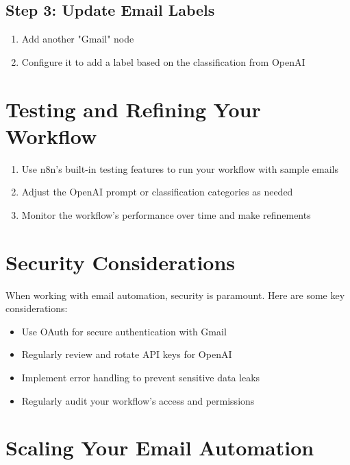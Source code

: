 
\subsection{Step 3: Update Email Labels}

\begin{enumerate}
    \item Add another "Gmail" node
    \item Configure it to add a label based on the classification from OpenAI
\end{enumerate}



\section{Testing and Refining Your Workflow}

\begin{enumerate}
    \item Use n8n's built-in testing features to run your workflow with sample emails
    \item Adjust the OpenAI prompt or classification categories as needed
    \item Monitor the workflow's performance over time and make refinements
\end{enumerate}


\section{Security Considerations}

When working with email automation, security is paramount. Here are some key considerations:

\begin{itemize}
    \item Use OAuth for secure authentication with Gmail
    \item Regularly review and rotate API keys for OpenAI
    \item Implement error handling to prevent sensitive data leaks
    \item Regularly audit your workflow's access and permissions
\end{itemize}


\section{Scaling Your Email Automation}

